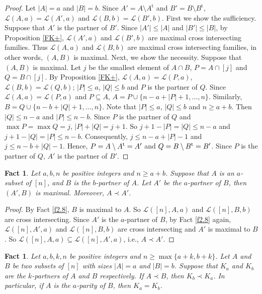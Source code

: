 \documentclass[a4paper,11pt]{article}
\newtheorem{fact}[theorem]{Fact}
\begin{document}
\begin{proof}
Let $|A|=a$ and $|B|=b$.
Since $A'=A\setminus A^{\mathrm{t}}$ and $B'=B\setminus B^{\mathrm{t}}$, $\mathcal{L}(A, a)=\mathcal{L}(A', a)$ and $\mathcal{L}(B, b)=\mathcal{L}(B', b)$.
First we show the sufficiency.  Suppose that $A'$ is the partner of $B'$. Since $|A'|\leq |A|$ and $|B'|\leq |B|$, by Proposition \ref{FK+}, $\mathcal{L}(A', a)$ and $\mathcal{L}(B', b)$ are maximal cross intersecting families. Thus $\mathcal{L}(A, a)$ and $\mathcal{L}(B, b)$ are maximal cross intersecting families, in other words, $(A, B)$ is maximal.
Next, we show the necessity. Suppose that $(A, B)$ is maximal. Let $j$ be the smallest element of $A\cap B$, $P=A\cap [j]$ and $Q=B\cap [j]$. By Proposition \ref{FK+},
$\mathcal{L}(A, a)=\mathcal{L}(P, a)$, $\mathcal{L}(B, b)=\mathcal{L}(Q, b)$;
$|P|\leq a$, $|Q|\leq b$ and
 $P$ is the partner of $Q$.
Since $\mathcal{L}(A, a)=\mathcal{L}(P, a)$ and $P\subseteq A$,  $A=P\cup \{n-a+|P|+1, \dots, n\}$. Similarly,  $B=Q\cup \{n-b+|Q|+1, \dots, n\}$.
Note that $|P|\leq a$, $|Q|\leq b$ and $n\geq a+b$. Then $|Q|\leq n-a$ and $|P|\leq n-b$. Since $P$ is the partner of $Q$ and $\max P=\max Q=j$, $|P|+|Q|=j+1$.
So $j+1-|P|=|Q|\leq n-a$ and $j+1-|Q|=|P|\leq n-b$. Consequently, $j\leq n-a+|P|-1$ and $j\leq n-b+|Q|-1$. Hence, $P=A\setminus A^{\rm t}=A'$ and $Q=B\setminus B^{\rm t}=B'$.
 Since  $P$ is the partner of $Q$, $A'$ is the partner of $B'$.
\end{proof}






\begin{fact}\label{f2.10}
Let $a, b, n$ be positive integers and $n\geq a+b$. Suppose that $A$ is an $a$-subset of $[n]$, and $B$ is the $b$-partner of $A$. Let $A'$ be the  $a$-partner of $B$, then $(A', B)$ is maximal. Moreover, $A\prec A'$.
\end{fact}

\begin{proof}
By Fact \ref{f2.8},  $B$ is maximal to $A$. So $\mathcal{L}([n], A, a)$ and $\mathcal{L}([n], B, b)$ are cross intersecting. Since $A'$ is the  $a$-partner of $B$, by Fact \ref{f2.8} again,
$\mathcal{L}([n], A', a)$ and $\mathcal{L}([n], B, b)$ are cross intersecting and $A'$ is maximal to $B$. So $\mathcal{L}([n], A, a)\subseteq \mathcal{L}([n], A', a)$, i.e., $A\prec A'$.
\end{proof}



\begin{fact}\label{fact2.7}
Let $a, b, k, n$ be positive integers and $n\geq \max\{a+k, b+k\}$. Let $A$  and $B$ be two subsets of $[n]$ with sizes $|A|=a$ and $|B|=b$. Suppose that $K_a$ and $K_b$ are the $k$-partners of $A$ and $B$ respectively. If $A\prec B$, then $K_b\prec K_a$. In particular, if $A$ is the $a$-parity of $B$, then $K_a= K_b$.
\end{fact}
\end{document}
